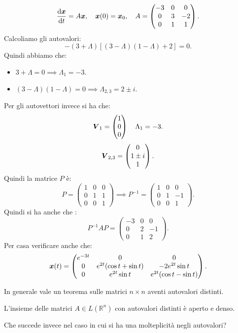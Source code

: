 \begin{exmp}[Dimensione 3]
    \[
	\frac{\text{d} \boldsymbol{x}}{\text{d} t} = A \boldsymbol{x}, \quad \boldsymbol{x}(0) = \boldsymbol{x}_0, \quad 
	A = 
	\begin{pmatrix} -3 & 0 & 0 \\
	0 & 3 & -2 \\
	0 & 1 & 1
    	\end{pmatrix} 
    .\] 
    Calcoliamo gli autovalori:
    \[
	-(3 + \Lambda) \left[(3-\Lambda) (1-\Lambda) + 2\right]=0
    .\] 
    Quindi abbiamo che:
    \begin{itemize}
        \item $3+\Lambda  = 0 \implies  \Lambda_1 = -3$.
	\item $(3-\Lambda) (1-\Lambda) = 0 \implies  \Lambda_{2,3} = 2 \pm i $.
    \end{itemize}
    Per gli autovettori invece si ha che:
    \[
        \boldsymbol{V}_1 = \begin{pmatrix} 1 \\ 0 \\ 0 \end{pmatrix} \quad \Lambda_1 = -3
    .\] 
    \[
	\boldsymbol{V}_{2, 3} = \begin{pmatrix} 0 \\ 1 \pm i \\ 1 \end{pmatrix} 
    .\] 
    Quindi la matrice $P$ è:
    \[
	P = 
	\begin{pmatrix} 
	    1 & 0 & 0 \\
	    0 & 1 & 1 \\
	    0 & 0 & 1
	\end{pmatrix}  \implies  
	P^{-1} = 
	\begin{pmatrix} 
	    1 & 0 & 0 \\
	    0 & 1 & -1\\
	    0 & 0 & 1
	\end{pmatrix} 
    .\] 
    Quindi si ha anche che  :
    \[
        P^{-1}A P = 
	\begin{pmatrix} 
	    -3 & 0 & 0 \\
	    0 & 2 & -1 \\
	    0 & 1 & 2 
	\end{pmatrix} 
    .\] 
    Per casa verificare anche che:
    \[
	\boldsymbol{x}(t) = 
	\begin{pmatrix} 
	    e^{-3t} & 0 & 0 \\
	    0 & e^{2t}(\cos t + \sin t) & -2e^{2t}\sin t \\
	    0 & e^{2t}\sin t & e^{2t}(\cos t - \sin t) 
	\end{pmatrix} 
    .\] 
\end{exmp}
\noindent
In generale vale un teorema sulle matrici $n\times n$ aventi autovalori distinti.
\begin{thm}
    L'insieme delle matrici $A \in L(\mathbb{R}^n)$ con autovalori distinti è aperto e denso.
\end{thm}
\noindent
Che succede invece nel caso in cui si ha una molteplicità negli autovalori?


